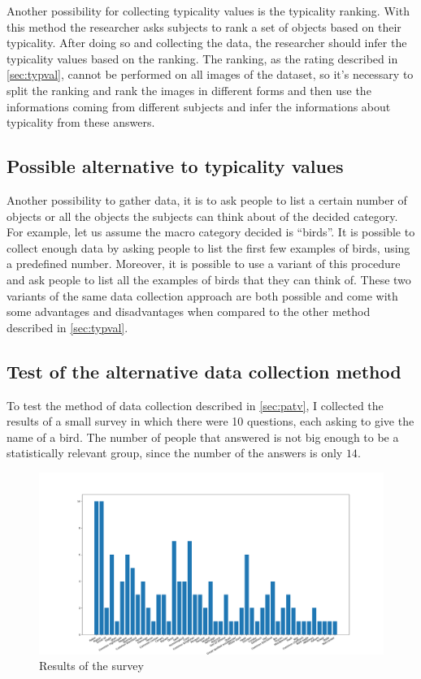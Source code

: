 \documentclass[conference]{IEEEtran}
\begin{document}
			\noindent Another possibility for collecting typicality values is the typicality ranking. With this method the researcher asks subjects to rank a set of objects based on their typicality. After doing so 
			and collecting the data, the researcher should infer the typicality values based on the ranking. The ranking, as the rating described in \ref{sec:typval}, cannot be performed on all images of the dataset, 
			so it's necessary to split the ranking and rank the images in different forms and then use the informations coming from different subjects and infer the informations about typicality from these answers.
			
		\subsection{Possible alternative to typicality values\label{sec:patv}}
		
			\noindent Another possibility to gather data, it is to ask people to list a certain number of objects or all the objects the subjects can think about of the decided category. For example, let us assume the macro category decided 
			is ``birds''. It is possible to collect enough data by asking people to list the first few examples of birds, using a predefined number. Moreover, it is possible to use a variant of this procedure and ask people 
			to list all the examples of birds that they can think of. These two variants of the same data collection approach are both possible and come with some advantages and disadvantages when compared to the other 
			method described in \ref{sec:typval}. 
			
		\subsection{Test of the alternative data collection method}
	
			\noindent To test the method of data collection described in \ref{sec:patv}, I collected the results of a small survey in which there were 10 questions, each asking to give the name of a bird. The number of 
			people that answered is not big enough to be a statistically relevant group, since the number of the answers is only $14$.
	
		\begin{figure}
			\centerline{\includegraphics[width=\linewidth]{imgs/survey_hist.png}}
			\caption{Results of the survey}
			\label{fig:7}
		\end{figure}
		
\end{document}
